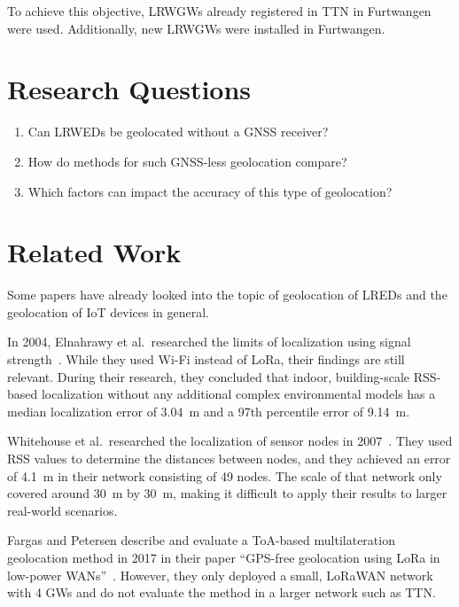 To achieve this objective, \aclp{LRWGW} already registered in \acf{TTN} in Furtwangen were used.
Additionally, new \aclp{LRWGW} were installed in Furtwangen.

\section{Research Questions}\label{sec:introduction-research-questions}

\begin{enumerate}
      \item Can \aclp{LRWED} be geolocated without a \ac{GNSS} receiver?
      \item How do methods for such \ac{GNSS}-less geolocation compare?
      \item Which factors can impact the accuracy of this type of geolocation?
\end{enumerate}

\section{Related Work}\label{sec:related-work}

Some papers have already looked into the topic of geolocation of \aclp{LRED} and the geolocation of \ac{IoT} devices in general.

In 2004, Elnahrawy et al.\ researched the limits of localization using signal strength~\cite{elnahrawy_limits_2004}.
While they used Wi-Fi instead of \ac{LoRa}, their findings are still relevant.
During their research, they concluded that indoor, building-scale \ac{RSS}-based localization without any additional complex environmental models has a median localization error of \SI{3.04}{\meter} and a 97th percentile error of \SI{9.14}{\meter}.

Whitehouse et al.\ researched the localization of sensor nodes in 2007~\cite{whitehouse_practical_2007}.
They used \ac{RSS} values to determine the distances between nodes, and they achieved an error of \SI{4.1}{\meter} in their network consisting of 49 nodes.
The scale of that network only covered around \SI{30}{\meter} by \SI{30}{\meter}, making it difficult to apply their results to larger real-world scenarios.

Fargas and Petersen describe and evaluate a \ac{ToA}-based multilateration geolocation method in 2017 in their paper ``\acs{GPS}-free geolocation using \acs{LoRa} in low-power \acsp{WAN}''~\cite{fargas_gps-free_2017}.
However, they only deployed a small, \ac{LoRaWAN} network with 4 \aclp{GW} and do not evaluate the method in a larger network such as \ac{TTN}.

